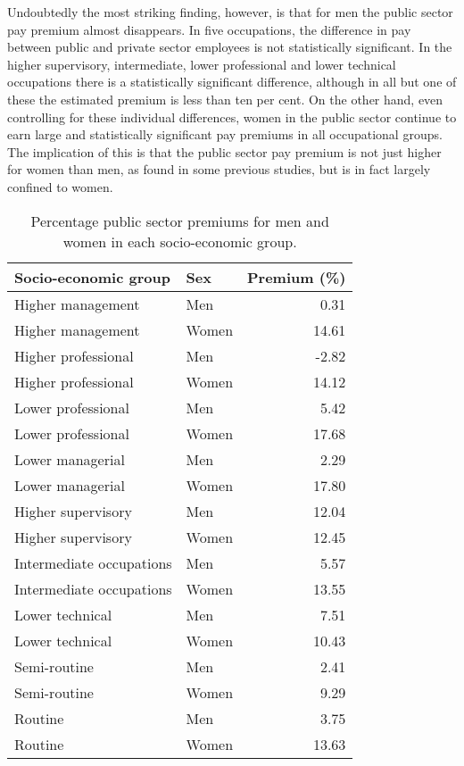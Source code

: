 \documentclass[a4paper,11pt,titlepage]{article}
\begin{document}
Undoubtedly the most striking finding, however, is that for men the public sector pay premium almost disappears.  In five occupations, the difference in pay between public and private sector employees is not statistically significant.  In the higher supervisory, intermediate, lower professional and lower technical occupations there is a statistically significant difference, although in all but one of these the estimated premium is less than ten per cent.  On the other hand, even controlling for these individual differences, women in the public sector continue to earn large and statistically significant pay premiums in all occupational groups.  The implication of this is that the public sector pay premium is not just higher for women than men, as found in some previous studies, but is in fact largely confined to women.

\begin{table}[ht]
    \caption{Percentage public sector premiums for men and women in each socio-economic group. \label{tab:fullprem}}
    \begin{center}
    \begin{tabular}{llr}
\toprule
     Socio-economic group & Sex & Premium (\%) \\
\midrule
  Higher management & Men & 0.31 \\
  Higher management & Women & 14.61 \\
  Higher professional & Men & -2.82 \\
  Higher professional & Women & 14.12 \\
  Lower professional & Men & 5.42 \\
  Lower professional & Women & 17.68 \\
  Lower managerial & Men & 2.29 \\
  Lower managerial & Women & 17.80 \\
  Higher supervisory & Men & 12.04 \\
  Higher supervisory & Women & 12.45 \\
  Intermediate occupations & Men & 5.57 \\
  Intermediate occupations & Women & 13.55 \\
  Lower technical & Men & 7.51 \\
  Lower technical & Women & 10.43 \\
  Semi-routine & Men & 2.41 \\
  Semi-routine & Women & 9.29 \\
  Routine & Men & 3.75 \\
  Routine & Women & 13.63 \\
\bottomrule
    \end{tabular}
    \end{center}
\end{table}
\end{document}
